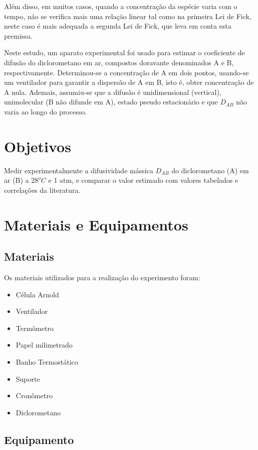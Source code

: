 Além disso, em muitos casos, quando a concentração da espécie varia com o tempo, não se verifica mais uma relação linear tal como na primeira Lei de Fick, neste caso é mais adequada a segunda Lei de Fick, que leva em conta esta premissa.

Neste estudo, um aparato experimental foi usado para estimar o coeficiente de difusão do diclorometano em ar, compostos doravante denominados A e B, respectivamente. Determinou-se a concentração de A em dois pontos, usando-se um ventilador para garantir a dispersão de A em B, isto é, obter concentração de A nula. Ademais, assumiu-se que a difusão é unidimensional (vertical), unimolecular (B não difunde em A), estado pseudo estacionário e que $D_{AB}$ não varia ao longo do processo.
\\

\chapter{Objetivos}

Medir experimentalmente a difusividade mássica $D_{AB}$ do diclorometano (A) em ar (B) a $28^{o} C$ e 1 atm, e comparar o valor estimado com valores tabelados e correlações da literatura.
\\

\chapter{Materiais e Equipamentos}

\section{Materiais}

Os materiais utilizados para a realização do experimento foram:

\begin{itemize}
\item	Célula Arnold
\item	Ventilador
\item	Termômetro
\item	Papel milimetrado
\item	Banho Termostático
\item	Suporte
\item	Cronômetro
\item	Diclorometano
\end{itemize}

\section{Equipamento}

